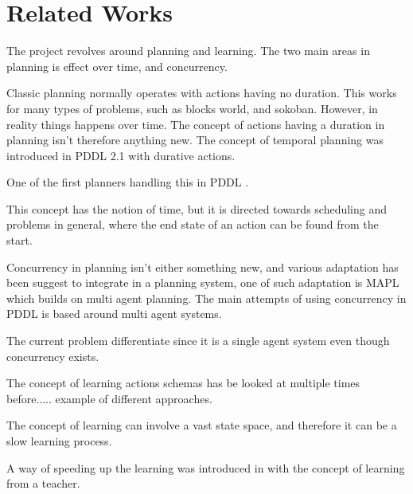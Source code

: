 \section{Related Works}
The project revolves around planning and learning. The two main areas in planning is effect over time, and concurrency. 

Classic planning normally operates with actions having no duration. This works for many types of problems, such as blocks world, and sokoban. However, in reality things happens over time. The concept of actions having a duration in planning isn't therefore anything new. The concept of temporal planning was introduced in PDDL 2.1 with durative actions. %

One of the first planners handling this in PDDL \cite{durative}. 

This concept has the notion of time, but it is directed towards scheduling and problems in general, where the end state of an action can be found from the start.
%
%	
%
%	
%	



Concurrency in planning isn't either something new, and various adaptation has been suggest to integrate in a planning system, one of such adaptation is MAPL which builds on multi agent planning\cite{mapl}. The main attempts of using concurrency in PDDL is based around multi agent systems. 

The current problem differentiate since it is a single agent system even though concurrency exists. 

The concept of learning actions schemas has be looked at multiple times before..... example of different approaches.

The concept of learning can involve a vast state space, and therefore it can be a slow learning process. 

A way of speeding up the learning was introduced in \cite{Action-Schemas} with the concept of learning from a teacher. 

